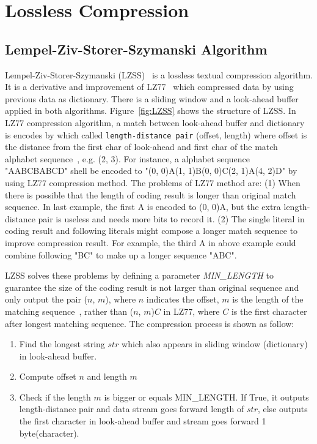 \section{Lossless Compression}
\label{sec:lossless}

\subsection{Lempel-Ziv-Storer-Szymanski Algorithm}
Lempel-Ziv-Storer-Szymanski (LZSS)~\cite{storer1982data} is a lossless textual
compression algorithm.  It is a derivative and improvement of
LZ77~\cite{ziv1977universal} which  compressed data by using previous data as
dictionary. There is a sliding window and a look-ahead buffer applied in both
algorithms. Figure~\ref{fig:LZSS} shows the structure of LZSS. In LZ77
compression algorithm, a match between look-ahead buffer and dictionary is
encodes by which called \texttt{length-distance pair} (offset, length) where
offset is the distance from the first char of look-ahead and first char of the
match alphabet sequence~\cite{ziv1977universal}, e.g. (2, 3). For instance, a
alphabet sequence "AABCBABCD" shell be encoded to "(0, 0)A(1, 1)B(0, 0)C(2,
1)A(4, 2)D"  by using LZ77 compression method.
The problems of LZ77 method are: (1) When there is possible that the length of
coding result is longer than original match sequence. In last example, the first
A is encoded to (0, 0)A, but the extra length-distance pair is useless and needs
more bits to record it. (2) The single literal in coding result and following
literals might compose a longer match sequence to improve compression result.
For example, the third A in above example could combine following "BC" to make
up a longer sequence "ABC". 

LZSS solves these problems by defining a parameter \emph{MIN\_LENGTH} to
guarantee the size of the coding result is not larger than original sequence and
only output the pair ($n$, $m$), where $n$ indicates the offset, $m$ is the
length of the matching sequence~\cite{storer1982data}, rather than ($n$, $m$)$C$
in LZ77, where $C$ is the first character after longest matching sequence. The
compression process is shown as follow:

\begin{enumerate}
    \item Find the longest string $str$ which also appears in sliding
    window (dictionary) in look-ahead buffer.
    \item Compute offset $n$ and length $m$
    \item Check if the length $m$ is bigger or equals MIN\_LENGTH. If True, it
    outputs length-distance pair and data stream goes forward length of $str$,
    else outputs the first character in look-ahead buffer and stream goes
    forward 1 byte(character).
\end{enumerate}

